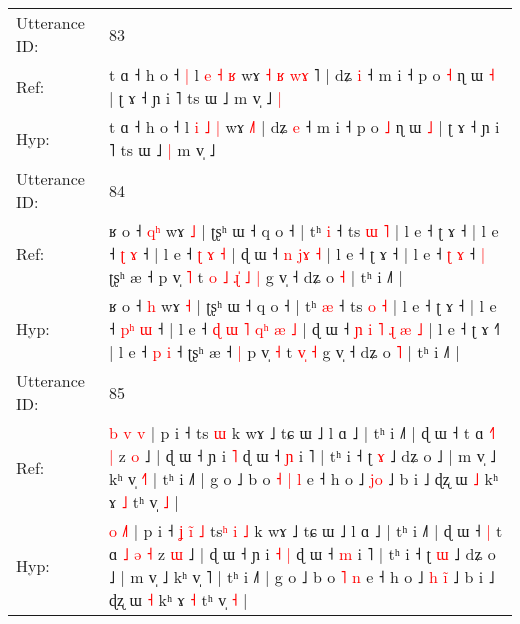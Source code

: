 \documentclass[10pt]{article}
\DeclareRobustCommand{\hl}[1]{{\textcolor{red}{#1}}}
\begin{document}
\begin{longtable}{ll}
 \\
\midrule
Utterance ID: & 83 \\
Ref: & t ɑ ˧ h o ˧\hl{ }\hl{|} l \hl{e} \hl{˧} \hl{ʁ} wɤ\hl{ }\hl{˧}\hl{ }\hl{ʁ} \hl{w}\hl{ɤ}\hl{ }˥ | dʑ \hl{i} ˧ m i ˧ p o \hl{˧} ɳ ɯ \hl{˧} | ʈ ɤ ˧ ɲ i ˥ ts ɯ ˩\hl{}\hl{} m v̩ ˩\hl{ }\hl{|}
 \\
Hyp: & t ɑ ˧ h o ˧\hl{}\hl{} l \hl{i} \hl{˩} \hl{|} wɤ\hl{}\hl{}\hl{}\hl{} \hl{}\hl{}\hl{˩}˥ | dʑ \hl{e} ˧ m i ˧ p o \hl{˩} ɳ ɯ \hl{˩} | ʈ ɤ ˧ ɲ i ˥ ts ɯ ˩\hl{ }\hl{|} m v̩ ˩\hl{}\hl{}
 \\
\midrule
Utterance ID: & 84 \\
Ref: & ʁ o ˧ \hl{q}\hl{ʰ} wɤ \hl{˩} | ʈʂʰ ɯ ˧ q o ˧ | tʰ \hl{i} ˧ ts \hl{ɯ} \hl{˥} | l e ˧ ʈ ɤ ˧ | l e ˧ \hl{}\hl{ʈ} \hl{ɤ} ˧ | l e ˧\hl{}\hl{}\hl{}\hl{}\hl{}\hl{} \hl{}\hl{ʈ} \hl{ɤ} \hl{˧} | ɖ ɯ ˧\hl{}\hl{}\hl{}\hl{} \hl{n} \hl{}\hl{j}\hl{ɤ} \hl{˧} | l e ˧ ʈ ɤ ˧\hl{} | l e ˧ \hl{ʈ} \hl{ɤ} ˧\hl{ }\hl{|} ʈʂʰ æ ˧\hl{}\hl{} p v̩ \hl{˥} t\hl{ }\hl{o}\hl{ }\hl{˩} \hl{ɻ}\hl{̍}\hl{ }\hl{˩} \hl{|} g v̩ ˧ dʑ o \hl{˧} | tʰ i ˩˥ |
 \\
Hyp: & ʁ o ˧ \hl{}\hl{h} wɤ \hl{˧} | ʈʂʰ ɯ ˧ q o ˧ | tʰ \hl{æ} ˧ ts \hl{o} \hl{˧} | l e ˧ ʈ ɤ ˧ | l e ˧ \hl{p}\hl{ʰ} \hl{ɯ} ˧ | l e ˧\hl{ }\hl{ɖ}\hl{ }\hl{ɯ}\hl{ }\hl{˥} \hl{q}\hl{ʰ} \hl{æ} \hl{˩} | ɖ ɯ ˧\hl{ }\hl{ɲ}\hl{ }\hl{i} \hl{˥} \hl{ɻ}\hl{ }\hl{æ} \hl{˩} | l e ˧ ʈ ɤ ˧\hl{˥} | l e ˧ \hl{p} \hl{i} ˧\hl{}\hl{} ʈʂʰ æ ˧\hl{ }\hl{|} p v̩ \hl{˧} t\hl{}\hl{}\hl{}\hl{} \hl{}\hl{}\hl{v}\hl{̩} \hl{˧} g v̩ ˧ dʑ o \hl{˥} | tʰ i ˩˥ |
 \\
\midrule
Utterance ID: & 85 \\
Ref: & \hl{b} \hl{v}\hl{ }\hl{v} | p i ˧\hl{}\hl{}\hl{}\hl{}\hl{}\hl{}\hl{} ts\hl{}\hl{}\hl{} \hl{ɯ} k wɤ ˩ tɕ ɯ ˩ l ɑ ˩ | tʰ i ˩˥ | ɖ ɯ ˧\hl{}\hl{} t ɑ \hl{}\hl{˧}\hl{˥} \hl{|} z \hl{o} ˩ | ɖ ɯ ˧ ɲ i\hl{}\hl{} \hl{˥} ɖ ɯ ˧ \hl{ɲ} i ˥ | tʰ i ˧ ʈ \hl{ɤ} ˩ dʑ o ˩ | m v̩ ˩ kʰ v̩ \hl{˧}˥ | tʰ i ˩˥ | g o ˩ b o\hl{ }\hl{˧} \hl{|} \hl{l} e ˧ h o ˩\hl{}\hl{} \hl{j}\hl{o} ˩ b i ˩ ɖʐ ɯ \hl{˩} kʰ ɤ \hl{˩} tʰ v̩ \hl{˩} |
 \\
Hyp: & \hl{o} \hl{}\hl{˩}\hl{˥} | p i ˧\hl{ }\hl{ʝ}\hl{ }\hl{i}\hl{̃}\hl{ }\hl{˩} ts\hl{ʰ}\hl{ }\hl{i} \hl{˩} k wɤ ˩ tɕ ɯ ˩ l ɑ ˩ | tʰ i ˩˥ | ɖ ɯ ˧\hl{ }\hl{|} t ɑ \hl{˩}\hl{ }\hl{ə} \hl{˧} z \hl{ɯ} ˩ | ɖ ɯ ˧ ɲ i\hl{ }\hl{˧} \hl{|} ɖ ɯ ˧ \hl{m} i ˥ | tʰ i ˧ ʈ \hl{ɯ} ˩ dʑ o ˩ | m v̩ ˩ kʰ v̩ \hl{}˥ | tʰ i ˩˥ | g o ˩ b o\hl{}\hl{} \hl{˥} \hl{n} e ˧ h o ˩\hl{ }\hl{h} \hl{i}\hl{̃} ˩ b i ˩ ɖʐ ɯ \hl{˧} kʰ ɤ \hl{˧} tʰ v̩ \hl{˧} |
 \\
\midrule

\end{longtable}
\end{document}
